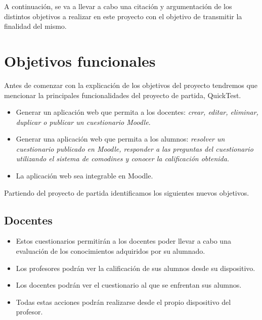 
A continuación, se va a llevar a cabo una citación y argumentación de los distintos objetivos a realizar en este proyecto con el objetivo de transmitir la finalidad del mismo.

\section{Objetivos funcionales}

Antes de comenzar con la explicación de los objetivos del proyecto tendremos que mencionar la principales funcionalidades del proyecto de partida, QuickTest.

\begin{itemize}
	\item Generar un aplicación web que permita a los docentes: \emph{crear, editar, eliminar, duplicar o publicar un cuestionario Moodle}.
	
	\item Generar una aplicación web que permita a los alumnos: \emph{resolver un cuestionario publicado en Moodle, responder a las preguntas del cuestionario utilizando el sistema de comodines y conocer la calificación obtenida.}
	
	\item La aplicación web sea integrable en Moodle.
\end{itemize}

Partiendo del proyecto de partida identificamos los siguientes nuevos objetivos.

\subsection{Docentes}

\begin{itemize}

	\item Estos cuestionarios permitirán a los docentes poder llevar a cabo una evaluación de los conocimientos adquiridos por su alumnado.
	
	\item Los profesores podrán ver la calificación de sus alumnos desde su dispositivo.
	
	\item Los docentes podrán ver el cuestionario al que se enfrentan sus alumnos.
	
	\item Todas estas acciones podrán realizarse desde el propio dispositivo del profesor.	
	
	
\end{itemize}

